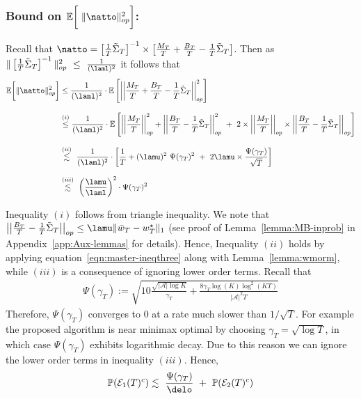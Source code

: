 \documentclass[11pt,letterpaper]{article}
\newcommand{\Prob}{\mathbb{P}}
\newcommand{\Exs}{\mathbb{E}}
\newcommand{\numactions}{|\mathcal{A}|}
\newcommand{\err}{\Psi(\gamma_T)}
\newcommand{\PT}{\tilde{\Sigma}_T}
\newcommand{\Eone}{\mathcal{E}_1(T)}
\newcommand{\Etwo}{\mathcal{E}_2(T)}
\theoremstyle{plain}
\theoremstyle{definition}  %
\begin{document}
\subsubsection*{Bound on $\Exs \bigg[ \ \| \natto \|^2_{op}  \bigg]$:}
\noindent Recall that $\natto = \left[\frac{1}{T} \PT \right]^{-1} \times \left[ \frac{M_T}{T} + \frac{B_T}{T}-\frac{1}{T} \PT\right]$. Then as $\|\left[\frac{1}{T} \PT \right]^{-1} \|^2_{op} \ \leq \ \frac{1}{(\laml)^2} $ it follows that
\begin{align}
\notag
 \Exs \bigg[ \| \natto \|^2_{op} \bigg] 
 &\leq \frac{1}{(\laml)^2} \cdot \Exs \left[  \left| \left| \frac{M_T}{T} + \frac{B_T}{T}-\frac{1}{T} \PT \right| \right|^2_{op} \right] \\[8pt] \notag
  &\overset{(i)}{\leq} \frac{1}{(\laml)^2} \cdot \Exs \left[   \left| \left| \frac{M_T}{T} \right| \right|^{2}_{op} + \left| \left|\frac{B_T}{T}-\frac{1}{T} \PT \right| \right|^{2}_{op} \ + \ 2 \times \left| \left| \frac{M_T}{T} \right| \right|_{op} \times \left| \left|\frac{B_T}{T}-\frac{1}{T} \PT \right| \right|_{op}    \right] \\[8pt] \notag
  &\overset{(ii)}{\lesssim} \ \frac{1}{(\laml)^2} \cdot  \left[   \frac{1}{T} + (\lamu)^2 \  \err^2 \ + \ 2 \lamu \times \frac{\err}{\sqrt{T}}    \right] \\[8pt]
   &\overset{(iii)}{\lesssim} \ \left(\frac{\lamu}{\laml} \right)^2 \cdot   \err^2  
\end{align}

\noindent Inequality $(i)$ follows from triangle inequality. We note that $\left| \left|\frac{B_T}{T}-\frac{1}{T} \PT \right| \right|_{op} \leq \lamu \|\bar{w}_T - w^\star_T\|_{1}$ (see proof of Lemma~\ref{lemma:MB-inprob} in Appendix~\ref{app:Aux-lemmas} for details). Hence,  Inequality $(ii)$ holds by applying equation~\eqref{eqn:master-ineqthree} along with Lemma~\ref{lemma:wmorm}, while $(iii)$ is a consequence of ignoring lower order terms. Recall that
\begin{align*}
   \err :=  \sqrt{10{\frac{\sqrt{\numactions \log K}}{\gamma_T}} +
     \frac{8\gamma_T \log(K) \log^2\left( KT \right) }{ \numactions^2 T  }  }
\end{align*} Therefore, $\err$ converges to $0$ at a rate much slower than $1/\sqrt{T}$. For example the proposed algorithm is near minimax optimal by choosing $\gamma_T = \sqrt{\log T}$, in which case $\err$ exhibits logarithmic decay.  Due to this reason we can ignore the lower order terms in inequality $(iii)$. Hence,
\begin{align}\label{eqn:RT-ctrB}
    \Prob(\Eone^c) \lesssim  \ \frac{\err}{\delo} \ + \ \Prob( \Etwo^c)   
\end{align}
\end{document}
